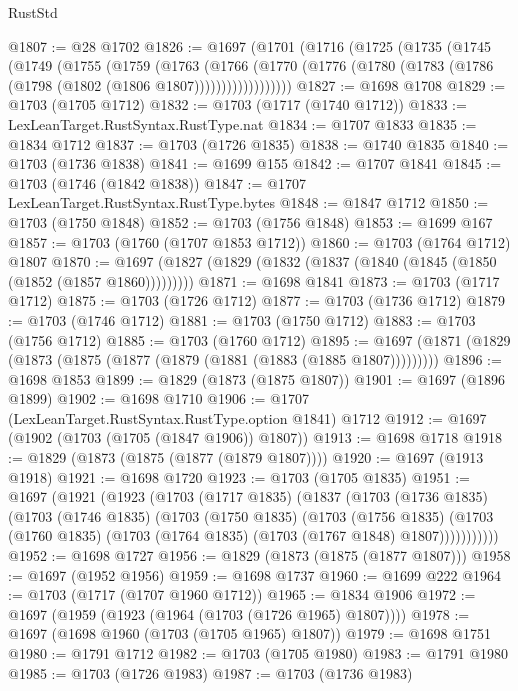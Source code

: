 \begin{lexlean}{RustStd}
\begin{coremodule}
@1807 := @28 @1702
@1826 := @1697
    (@1701
      (@1716
        (@1725
          (@1735
            (@1745
              (@1749
                (@1755
                  (@1759
                    (@1763
                      (@1766
                        (@1770
                          (@1776 (@1780 (@1783 (@1786 (@1798 (@1802 (@1806 @1807))))))))))))))))))
@1827 := @1698 @1708
@1829 := @1703 (@1705 @1712)
@1832 := @1703 (@1717 (@1740 @1712))
@1833 := LexLeanTarget.RustSyntax.RustType.nat
@1834 := @1707 @1833
@1835 := @1834 @1712
@1837 := @1703 (@1726 @1835)
@1838 := @1740 @1835
@1840 := @1703 (@1736 @1838)
@1841 := @1699 @155
@1842 := @1707 @1841
@1845 := @1703 (@1746 (@1842 @1838))
@1847 := @1707 LexLeanTarget.RustSyntax.RustType.bytes
@1848 := @1847 @1712
@1850 := @1703 (@1750 @1848)
@1852 := @1703 (@1756 @1848)
@1853 := @1699 @167
@1857 := @1703 (@1760 (@1707 @1853 @1712))
@1860 := @1703 (@1764 @1712) @1807
@1870 := @1697 (@1827 (@1829 (@1832 (@1837 (@1840 (@1845 (@1850 (@1852 (@1857 @1860)))))))))
@1871 := @1698 @1841
@1873 := @1703 (@1717 @1712)
@1875 := @1703 (@1726 @1712)
@1877 := @1703 (@1736 @1712)
@1879 := @1703 (@1746 @1712)
@1881 := @1703 (@1750 @1712)
@1883 := @1703 (@1756 @1712)
@1885 := @1703 (@1760 @1712)
@1895 := @1697 (@1871 (@1829 (@1873 (@1875 (@1877 (@1879 (@1881 (@1883 (@1885 @1807)))))))))
@1896 := @1698 @1853
@1899 := @1829 (@1873 (@1875 @1807))
@1901 := @1697 (@1896 @1899)
@1902 := @1698 @1710
@1906 := @1707 (LexLeanTarget.RustSyntax.RustType.option @1841) @1712
@1912 := @1697 (@1902 (@1703 (@1705 (@1847 @1906)) @1807))
@1913 := @1698 @1718
@1918 := @1829 (@1873 (@1875 (@1877 (@1879 @1807))))
@1920 := @1697 (@1913 @1918)
@1921 := @1698 @1720
@1923 := @1703 (@1705 @1835)
@1951 := @1697
    (@1921
      (@1923
        (@1703
          (@1717 @1835)
          (@1837
            (@1703
              (@1736 @1835)
              (@1703
                (@1746 @1835)
                (@1703
                  (@1750 @1835)
                  (@1703
                    (@1756 @1835)
                    (@1703 (@1760 @1835) (@1703 (@1764 @1835) (@1703 (@1767 @1848) @1807)))))))))))
@1952 := @1698 @1727
@1956 := @1829 (@1873 (@1875 (@1877 @1807)))
@1958 := @1697 (@1952 @1956)
@1959 := @1698 @1737
@1960 := @1699 @222
@1964 := @1703 (@1717 (@1707 @1960 @1712))
@1965 := @1834 @1906
@1972 := @1697 (@1959 (@1923 (@1964 (@1703 (@1726 @1965) @1807))))
@1978 := @1697 (@1698 @1960 (@1703 (@1705 @1965) @1807))
@1979 := @1698 @1751
@1980 := @1791 @1712
@1982 := @1703 (@1705 @1980)
@1983 := @1791 @1980
@1985 := @1703 (@1726 @1983)
@1987 := @1703 (@1736 @1983)

\end{coremodule}
\end{lexlean}
